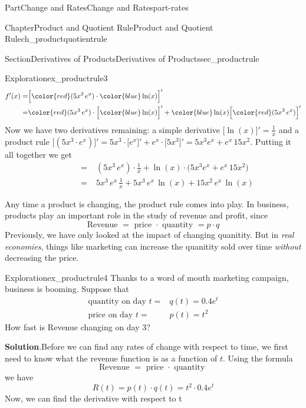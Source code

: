 \documentclass{tufte-book}
\newcommand{\blocktitlefont}{\relax}
\numberwithin{equation}{chapter}
\newcommand{\red}[1]{   {\color{red}   #1}   }
\newcommand{\blue}[1]{  {\color{blue}  #1}  }
\newcommand{\D}[1]{ \Big[ #1 \Big]'  }
\newcommand{\amp}{&}
\begin{document}
\begin{partptx}{Part}{Change and Rates}{}{Change and Rates}{}{}{part-rates}
\begin{chapterptx}{Chapter}{Product and Quotient Rule}{}{Product and Quotient Rule}{}{}{ch_productquotientrule}
\begin{sectionptx}{Section}{Derivatives of Products}{}{Derivatives of Products}{}{}{sec_productrule}
\begin{exploration}{Exploration}{}{ex_productrule3}
\begin{align*}
f'(x) = \amp \D{\red{(5x^3\, e^x)}\cdot \blue{\ln(x)}}  \\
= \amp \red{(5x^3\, e^x)}\cdot \D{\blue{\ln(x)}}  +  \blue{\ln(x)}\D{\red{(5x^3\, e^x)} } 
\end{align*}
Now we have two derivatives remaining: a simple derivative \(\D{{\ln(x)}} = \frac{1}{x}\) and a product rule \(\D{{(5x^3\cdot e^x)} } = 5x^3 \cdot \D{e^x} + e^x\cdot \D{5x^3} = 5x^3 e^x + e^x\, 15x^2\).  Putting it all together we get%
\begin{align*}
\phantom{f'(x)} = \amp {(5x^3\, e^x)}\cdot \frac{1}{x}  +  {\ln(x)}\cdot \Big( 5x^3 e^x + e^x\, 15x^2 \Big) \\
\phantom{f'(x)} = \amp 5x^3\, e^x \,\frac{1}{x}  +   5x^3\, e^x\, \ln(x) + 15x^2\,e^x\,  \ln(x) 
\end{align*}
%
\end{exploration}%
Any time a product is changing, the product rule comes into play. In business, products play an important role in the study of revenue and profit, since%
\begin{equation*}
\text{Revenue } = \text{ price }\cdot \text{ quantity } = p\cdot q
\end{equation*}
Previously, we have only looked at the impact of changing quanitity. But in \emph{real economies}, things like marketing can increase the quanitity sold over time \emph{without} decreasing the price.%
\begin{exploration}{Exploration}{}{ex_productrule4}%
Thanks to a word of mouth marketing campaign, business is booming.  Suppose that%
\begin{align*}
\text{quantity on day }t =\amp q(t) = 0.4e^t \\
\text{price on day }t =\amp p(t) = t^2   
\end{align*}
How fast is Revenue changing on day 3?%
\par\smallskip%
\noindent\textbf{\blocktitlefont Solution}.\hypertarget{ex_productrule4-2}{}\quad{}Before we can find any rates of change with respect to time, we first need to know what the revenue function is as a function of \(t\).  Using the formula%
\begin{equation*}
\text{Revenue } = \text{ price }\cdot \text{ quantity }
\end{equation*}
we have%
\begin{equation*}
R(t) = p(t) \cdot q(t) = t^2\cdot 0.4e^t
\end{equation*}
Now, we can find the derivative with respect to t%
\begin{align*}

\end{align*}
\end{exploration}
\end{sectionptx}
\end{chapterptx}
\end{partptx}
\end{document}

